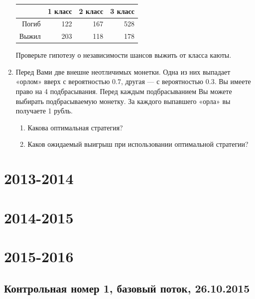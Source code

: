 \documentclass[12pt, a4paper]{article}\usepackage[]{graphicx}\usepackage[]{color}
\begin{document}
\begin{enumerate}
\begin{table}[ht]
\centering
\begin{tabular}{rrrr}
  \hline
 & 1 класс & 2 класс & 3 класс \\ 
  \hline
Погиб & 122 & 167 & 528 \\ 
  Выжил & 203 & 118 & 178 \\ 
   \hline
\end{tabular}
\end{table}


Проверьте гипотезу о независимости шансов выжить от класса каюты.

\item Перед Вами две внешне неотличимых монетки. Одна из них выпадает «орлом» вверх с вероятностью $0.7$, другая — с вероятностью $0.3$. Вы имеете право на 4 подбрасывания. Перед каждым подбрасыванием Вы можете выбирать подбрасываемую монетку. За каждого выпавшего «орла» вы получаете 1 рубль.
\begin{enumerate}
\item Какова оптимальная стратегия?
\item Каков ожидаемый выигрыш при использовании оптимальной стратегии?
\end{enumerate}

\end{enumerate}

\section{2013-2014}



\section{2014-2015}



\section{2015-2016}


\subsection{Контрольная номер 1, базовый поток, 26.10.2015}
\end{document}
